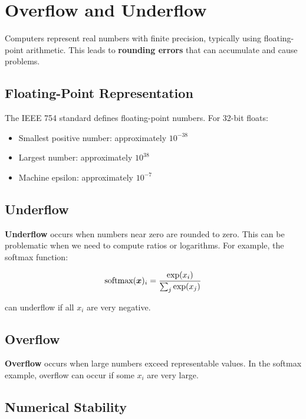 
\section{Overflow and Underflow}
\label{sec:overflow-underflow}

Computers represent real numbers with finite precision, typically using floating-point arithmetic. This leads to \textbf{rounding errors} that can accumulate and cause problems.

\subsection{Floating-Point Representation}

The IEEE 754 standard defines floating-point numbers. For 32-bit floats:
\begin{itemize}
    \item Smallest positive number: approximately $10^{-38}$
    \item Largest number: approximately $10^{38}$
    \item Machine epsilon: approximately $10^{-7}$
\end{itemize}

\subsection{Underflow}

\textbf{Underflow} occurs when numbers near zero are rounded to zero. This can be problematic when we need to compute ratios or logarithms. For example, the softmax function:

\begin{equation}
\text{softmax}(\boldsymbol{x})_i = \frac{\exp(x_i)}{\sum_j \exp(x_j)}
\end{equation}

can underflow if all $x_i$ are very negative.

\subsection{Overflow}

\textbf{Overflow} occurs when large numbers exceed representable values. In the softmax example, overflow can occur if some $x_i$ are very large.

\subsection{Numerical Stability}

